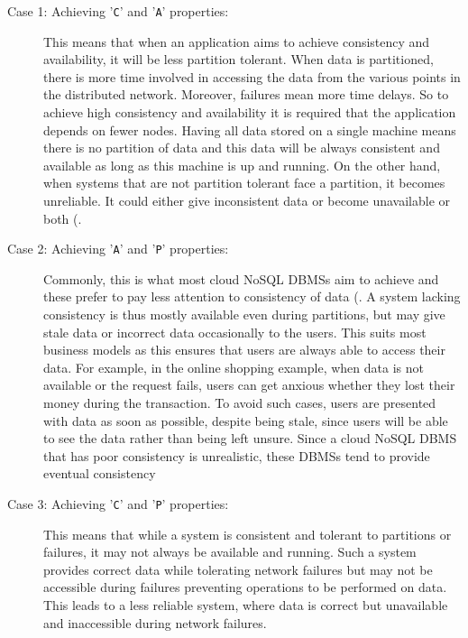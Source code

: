 \begin{description}
	\item [Case 1: Achieving '\texttt{C}' and '\texttt{A}' properties:] This means
	that when an application aims to achieve consistency and availability, it will
	be less partition tolerant.
	When data is partitioned,   there is more time involved in accessing the data
	from the various points in the distributed network.  Moreover,   failures mean
	more time delays.  So to achieve high consistency and availability it is
	required that the application depends on fewer nodes.  Having all data stored on
	a single machine means there is no partition of data and this data will be
	always consistent and available as long as this machine is up and running.   On
	the other hand,   when systems that are not partition tolerant face a partition,
	it becomes unreliable.  It could either give inconsistent data or become
	unavailable or both (.
		
	\item [Case 2: Achieving '\texttt{A}' and '\texttt{P}' properties:]
	Commonly,   this is what most cloud \ac{NoSQL} \acp{DBMS} aim to achieve and these
	prefer to pay less attention to consistency of data (. 
	A system lacking consistency is thus mostly available even during partitions,   but
	may give stale data or incorrect data occasionally to the users.  This suits
	most business models as this ensures that users are always able to
	access their data.  For example,   in the  online shopping example,   when
	data is not available or the request fails,   users can get anxious whether
	they lost their money during the transaction.  To avoid such cases,   users
	are presented with data as soon as possible,   despite being stale,   since users
	will be able to see the data rather than being left unsure. 
	Since a cloud \ac{NoSQL} \ac{DBMS} that has poor consistency is unrealistic,  
	these \acp{DBMS} tend to provide eventual consistency
	
	\item [Case 3: Achieving '\texttt{C}' and '\texttt{P}' properties:] This means
	that while a system is consistent and tolerant to partitions or
	failures,   it may not always be available and running.  Such a system 
	provides correct data while tolerating network failures but may not be
	accessible during failures preventing operations to be performed on data.  This
	leads to a less reliable system,   where data is correct but unavailable and
	inaccessible during network failures.
	
	 
\end{description}

